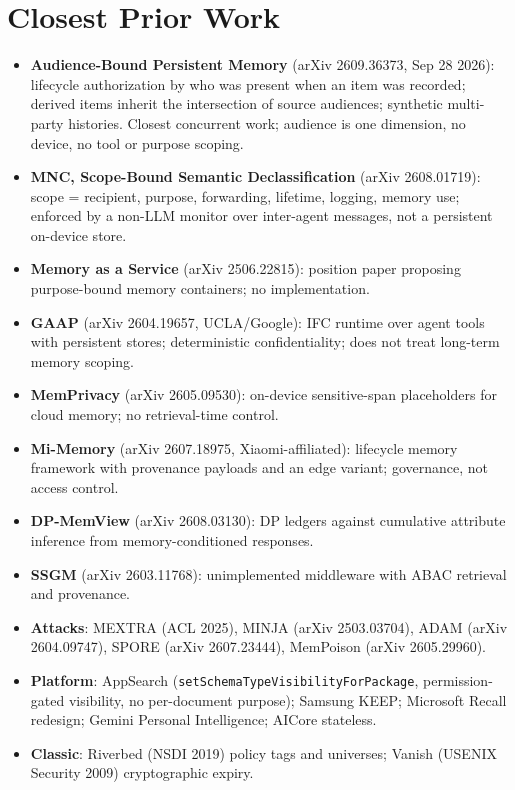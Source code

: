 \documentclass[11pt]{article}
\begin{document}
\section{Closest Prior Work}
\begin{itemize}
  \item \textbf{Audience-Bound Persistent Memory} (arXiv 2609.36373, Sep 28 2026): lifecycle authorization by who was present when an item was recorded; derived items inherit the intersection of source audiences; synthetic multi-party histories. Closest concurrent work; audience is one dimension, no device, no tool or purpose scoping.
  \item \textbf{MNC, Scope-Bound Semantic Declassification} (arXiv 2608.01719): scope = recipient, purpose, forwarding, lifetime, logging, memory use; enforced by a non-LLM monitor over inter-agent messages, not a persistent on-device store.
  \item \textbf{Memory as a Service} (arXiv 2506.22815): position paper proposing purpose-bound memory containers; no implementation.
  \item \textbf{GAAP} (arXiv 2604.19657, UCLA/Google): IFC runtime over agent tools with persistent stores; deterministic confidentiality; does not treat long-term memory scoping.
  \item \textbf{MemPrivacy} (arXiv 2605.09530): on-device sensitive-span placeholders for cloud memory; no retrieval-time control.
  \item \textbf{Mi-Memory} (arXiv 2607.18975, Xiaomi-affiliated): lifecycle memory framework with provenance payloads and an edge variant; governance, not access control.
  \item \textbf{DP-MemView} (arXiv 2608.03130): DP ledgers against cumulative attribute inference from memory-conditioned responses.
  \item \textbf{SSGM} (arXiv 2603.11768): unimplemented middleware with ABAC retrieval and provenance.
  \item \textbf{Attacks}: MEXTRA (ACL 2025), MINJA (arXiv 2503.03704), ADAM (arXiv 2604.09747), SPORE (arXiv 2607.23444), MemPoison (arXiv 2605.29960).
  \item \textbf{Platform}: AppSearch (\texttt{setSchemaTypeVisibilityForPackage}, permission-gated visibility, no per-document purpose); Samsung KEEP; Microsoft Recall redesign; Gemini Personal Intelligence; AICore stateless.
  \item \textbf{Classic}: Riverbed (NSDI 2019) policy tags and universes; Vanish (USENIX Security 2009) cryptographic expiry.
\end{itemize}
\end{document}
